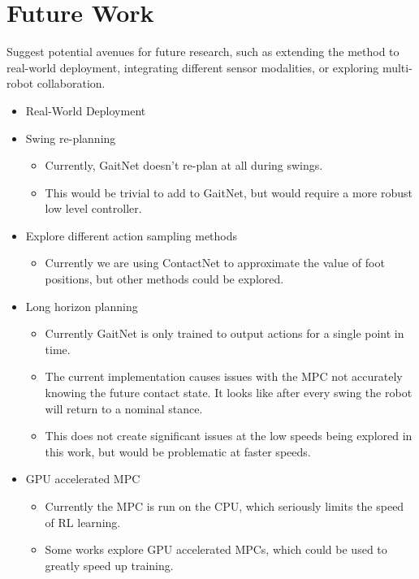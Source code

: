 \section{Future Work}

\begin{outline}
  Suggest potential avenues for future research, such as extending
  the method to real-world deployment, integrating different sensor
  modalities, or exploring multi-robot collaboration.
\end{outline}

\begin{itemize}
  \item Real-World Deployment

  \item Swing re-planning
    \begin{itemize}
      \item Currently, GaitNet doesn't re-plan at all during swings.
      \item This would be trivial to add to GaitNet, but would require
        a more robust low level controller.
    \end{itemize}

  \item Explore different action sampling methods
    \begin{itemize}
      \item Currently we are using ContactNet to approximate the
        value of foot positions, but other methods could be explored.
    \end{itemize}

  \item Long horizon planning
    \begin{itemize}
      \item Currently GaitNet is only trained to output actions
        for a single point in time.
      \item The current implementation causes issues with the MPC
        not accurately knowing the future contact state. It looks
        like after every swing the robot will return to a nominal stance.
      \item This does not create significant issues at the low speeds
        being explored in this work, but would be problematic at faster speeds.
    \end{itemize}

  \item GPU accelerated MPC
    \begin{itemize}
      \item Currently the MPC is run on the CPU, which seriously limits
        the speed of RL learning.
      \item Some works explore GPU accelerated MPCs, which could be used
        to greatly speed up training.
    \end{itemize}


\end{itemize}

